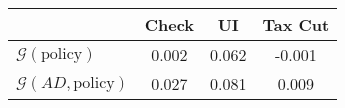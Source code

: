 \begin{tabular}{@{}lccc@{}} 
\toprule 
                          & Check      & UI    & Tax Cut    \\  \midrule 
$\mathcal{G}(\text{policy})$ & 0.002  & 0.062  & -0.001     \\ 
$\mathcal{G}(AD,\text{policy})$ & 0.027  & 0.081  & 0.009     \\ 
\end{tabular}  
